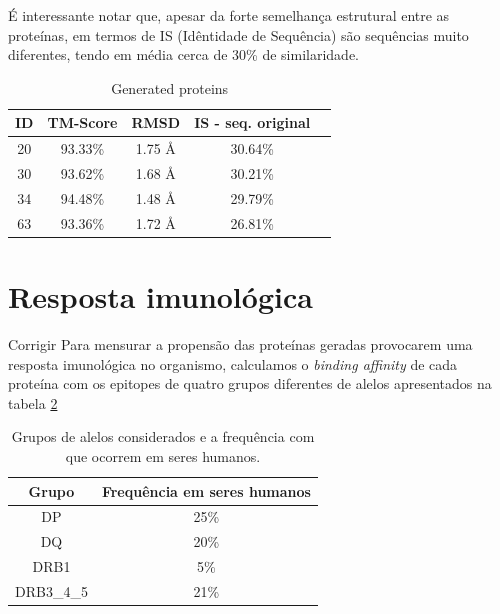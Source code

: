 É interessante notar que, apesar da forte semelhança estrutural entre as proteínas,
em termos de IS (Idêntidade de Sequência)
são sequências muito diferentes, tendo em média cerca de 30\% de similaridade. 
  
\begin{table}[htbp]
    \centering
    \begin{tabular}{c|cccc}
        \hline
        \textbf{ID} & \textbf{TM-Score} & \textbf{RMSD} & \textbf{IS - seq. original} \\
        \hline
         20 & 93.33\% & 1.75 Å & 30.64\% \\
         30 & 93.62\% & 1.68 Å & 30.21\% \\
         34 & 94.48\% & 1.48 Å & 29.79\% \\
         63 & 93.36\% & 1.72 Å & 26.81\% \\
        \hline
    \end{tabular}
    \caption{Generated proteins}
    \label{tab:tabela_exemplo}
\end{table}



\section{Resposta imunológica}

{\color{red} Corrigir}
Para mensurar a propensão das proteínas geradas provocarem uma resposta imunológica no organismo, 
calculamos o \textit{binding affinity} de cada proteína com os epitopes de quatro grupos diferentes 
de alelos apresentados na tabela \ref{tab:alelo_grupos}


    \begin{table}[]
        \begin{tabular}{|c|c|}
        \hline
        \rowcolor[HTML]{C0C0C0} 
        {\color[HTML]{343434} Grupo} & {\color[HTML]{343434} Frequência em seres humanos} \\ \hline
        DP                                                                         & 25\%                                                                           \\ \hline
        DQ                                                                         & 20\%                                                                           \\ \hline
        DRB1                                                                       & 5\%                                                                            \\ \hline
        DRB3\_4\_5                                                                 & 21\%                                                                           \\ \hline
        \end{tabular}
        \caption{Grupos de alelos considerados e a frequência com que ocorrem em seres humanos.}
        \label{tab:alelo_grupos}
        \end{table}


